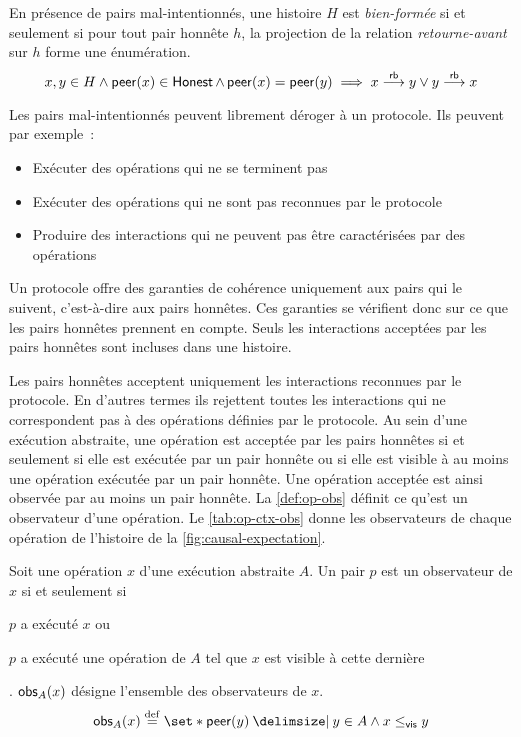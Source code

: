 \begin{definition}\label{def:wf-history-malicious}
En présence de pairs mal-intentionnés, une histoire $H$ est \emph{bien-formée} si et seulement si pour tout pair honnête $h$, la projection de la relation \emph{retourne-avant} sur $h$ forme une énumération.
\begin{equation*}
x, y \in H \land \operatorname{\mathsf{peer}}(x) \in \operatorname{\mathsf{Honest}} \land \operatorname{\mathsf{peer}}(x) = \operatorname{\mathsf{peer}}(y) \implies x \overset{\mathsf{rb}}{\longrightarrow} y \lor y \overset{\mathsf{rb}}{\longrightarrow} x
\end{equation*}
\end{definition}

Les pairs mal-intentionnés peuvent librement déroger à un protocole.
Ils peuvent par exemple~:
\begin{itemize}
    \item Exécuter des opérations qui ne se terminent pas
    \item Exécuter des opérations qui ne sont pas reconnues par le protocole
    \item Produire des interactions qui ne peuvent pas être caractérisées par des opérations
\end{itemize}
Un protocole offre des garanties de cohérence uniquement aux pairs qui le suivent, c'est-à-dire aux pairs honnêtes.
Ces garanties se vérifient donc sur ce que les pairs honnêtes prennent en compte.
Seuls les interactions acceptées par les pairs honnêtes sont incluses dans une histoire.

Les pairs honnêtes acceptent uniquement les interactions reconnues par le protocole.
En d'autres termes ils rejettent toutes les interactions qui ne correspondent pas à des opérations définies par le protocole.
Au sein d'une exécution abstraite, une opération est acceptée par les pairs honnêtes si et seulement si elle est exécutée par un pair honnête ou si elle est visible à au moins une opération exécutée par un pair honnête.
Une opération acceptée est ainsi observée par au moins un pair honnête.
La \autoref{def:op-obs} définit ce qu'est un observateur d'une opération.
Le \autoref{tab:op-ctx-obs} donne les observateurs de chaque opération de l'histoire de la \autoref{fig:causal-expectation}.

\begin{definition}[Observateurs]\label{def:op-obs}
Soit une opération $x$ d'une exécution abstraite $A$.
Un pair $p$ est un observateur de $x$ si et seulement si \begin{inlinelist}\item $p$ a exécuté $x$ ou \item $p$ a exécuté une opération de $A$ tel que $x$ est visible à cette dernière\end{inlinelist}.
$\operatorname{\mathsf{obs}}_A(x)$ désigne l'ensemble des observateurs de $x$.
\begin{equation*}
  \trm{obs}_A(x) \defeq \set*{ \trm{peer}(y) \given y \in A \land x \viseq y}
\end{equation*}
\end{definition}

